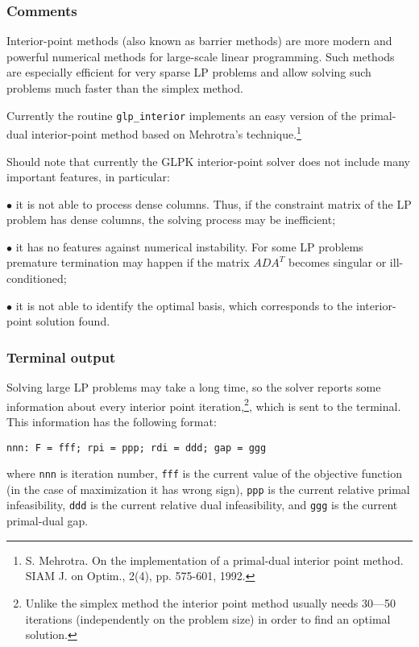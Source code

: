 \subsubsection*{Comments}

Interior-point methods (also known as barrier methods) are more modern
and powerful numerical methods for large-scale linear programming. Such
methods are especially efficient for very sparse LP problems and allow
solving such problems much faster than the simplex method.

Currently the routine \verb|glp_interior| implements an easy version of
the primal-dual interior-point method based on Mehrotra's
technique.\footnote{S. Mehrotra. On the implementation of a primal-dual
interior point method. SIAM J. on Optim., 2(4), pp. 575-601, 1992.}

Should note that currently the GLPK interior-point solver does not
include many important features, in particular:

\newpage

$\bullet$ it is not able to process dense columns. Thus, if the
constraint matrix of the LP problem has dense columns, the solving
process may be inefficient;

$\bullet$ it has no features against numerical instability. For some
LP problems premature termination may happen if the matrix $ADA^T$
becomes singular or ill-conditioned;

$\bullet$ it is not able to identify the optimal basis, which
corresponds to the interior-point solution found.

\subsubsection*{Terminal output}

Solving large LP problems may take a long time, so the solver reports
some information about every interior point iteration,\footnote{Unlike
the simplex method the interior point method usually needs 30---50
iterations (independently on the problem size) in order to find an
optimal solution.}, which is sent to the terminal. This information has
the following format:

\begin{verbatim}
nnn: F = fff; rpi = ppp; rdi = ddd; gap = ggg
\end{verbatim}

\noindent where \verb|nnn| is iteration number, \verb|fff| is the
current value of the objective function (in the case of maximization it
has wrong sign), \verb|ppp| is the current relative primal
infeasibility, \verb|ddd| is the current relative dual infeasibility,
and \verb|ggg| is the current primal-dual gap.

